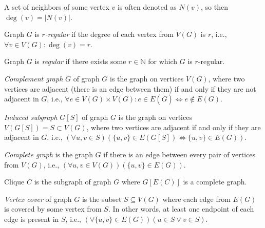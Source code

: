 A set of neighbors of some vertex $v$ is often denoted as $N(v)$, so then $\deg(v) = |N(v)|$.

\begin{definition}
    Graph $G$ is \emph{$r$-regular} if the degree of each vertex from $V(G)$ is $r$, i.e., $\forall v \in V(G) \colon \deg(v) = r$.
\end{definition}

\begin{definition}
    Graph $G$ is \emph{regular} if there exists some $r \in \mathbb{N}$ for which $G$ is $r$-regular.
\end{definition}

\begin{definition}
    \emph{Complement graph} $\overline{G}$ of graph $G$ is the graph on vertices $V(G)$,
    where two vertices are adjacent (there is an edge between them) if and only if
    they are not adjacent in $G$, i.e., $\forall e \in V(G) \times V(G) \colon e \in E(\overline{G}) \Leftrightarrow e \notin E(G)$.
\end{definition}

\begin{definition}
    \emph{Induced subgraph} $G[S]$ of graph $G$ is the graph on vertices $V(G[S]) = S \subset V(G)$,
    where two vertices are adjacent if and only if they are adjacent in $G$, i.e.,
    $(\forall u,v \in S)(\{u,v\} \in E(G[S]) \Leftrightarrow \{u,v\} \in E(G))$.
\end{definition}

\begin{definition}
    \emph{Complete graph} is the graph $G$ if there is an edge between every pair of vertices from $V(G)$, i.e.,
    $(\forall u,v \in V(G))(\{u,v\} \in E(G))$.
\end{definition}

\begin{definition}[Clique]
    Clique $C$ is the subgraph of graph $G$ where $G[E(C)]$ is a complete graph.
\end{definition}

\begin{definition}
    \emph{Vertex cover} of graph $G$ is the subset $S \subseteq V(G)$ where each edge from $E(G)$ is
    covered by some vertex from $S$. In other words, at least one endpoint of each edge is present in $S$, i.e.,
    $(\forall \{u,v\} \in E(G))(u \in S \vee v \in S)$.
\end{definition}


